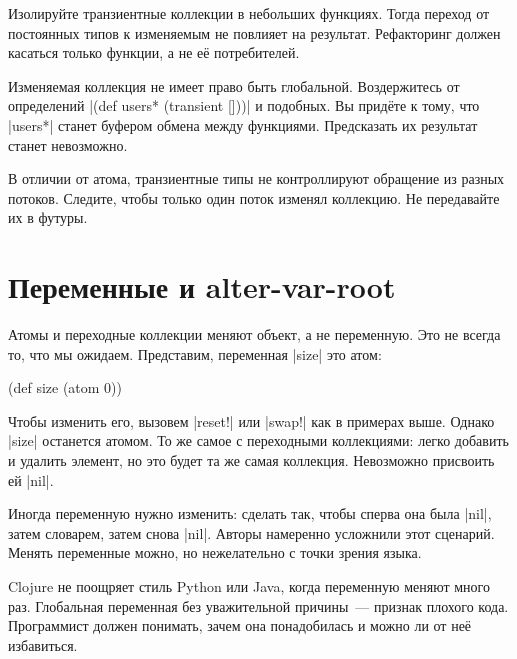 Изолируйте транзиентные коллекции в небольших функциях. Тогда переход от
постоянных типов к изменяемым не повлияет на результат. Рефакторинг должен
касаться только функции, а не е\"{е} потребителей.

Изменяемая коллекция не имеет право быть глобальной. Воздержитесь от определений
\spverb|(def users* (transient []))| и подобных. Вы прид\"{е}те к тому, что
\spverb|users*| станет буфером обмена между функциями. Предсказать их результат
станет невозможно.

В отличии от атома, транзиентные типы не контроллируют обращение из разных
потоков. Следите, чтобы только один поток изменял коллекцию. Не передавайте их в
футуры.

\section{Переменные и alter-var-root}


\label{alter-var-root}

Атомы и переходные коллекции меняют объект, а не переменную. Это не всегда то,
что мы ожидаем. Представим, переменная \spverb|size| это атом:

\begin{english}
  \begin{clojure}
(def size (atom 0))
  \end{clojure}
\end{english}

Чтобы изменить его, вызовем \spverb|reset!| или \spverb|swap!| как в примерах
выше. Однако \spverb|size| останется атомом. То же самое с переходными
коллекциями: легко добавить и удалить элемент, но это будет та же самая
коллекция. Невозможно присвоить ей \spverb|nil|.

Иногда переменную нужно изменить: сделать так, чтобы сперва она была
\spverb|nil|, затем словарем, затем снова \spverb|nil|. Авторы намеренно
усложнили этот сценарий. Менять переменные можно, но нежелательно с точки зрения
языка.


Clojure не поощряет стиль Python или Java, когда переменную меняют много
раз. Глобальная переменная без уважительной причины~--- признак плохого кода.
Программист должен понимать, зачем она понадобилась и можно ли от не\"{е}
избавиться.


